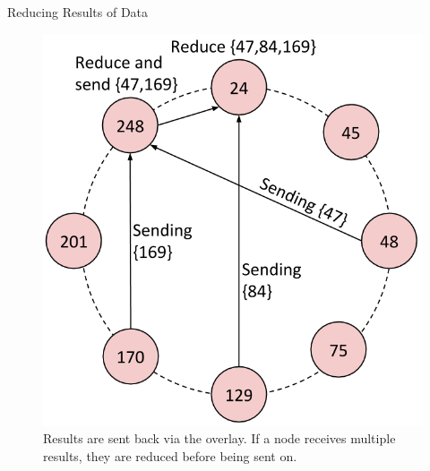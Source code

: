 \documentclass[11pt]{beamer}
\begin{document}
\begin{frame}{Reducing Results of Data}
	\begin{figure}
	    \includegraphics[width=0.50\linewidth]{figs/CR_dataflow3}
	    \caption{Results are sent back via the overlay. If a node receives multiple results, they are reduced before being sent on.}
	\end{figure}
\end{frame}

\end{document}
